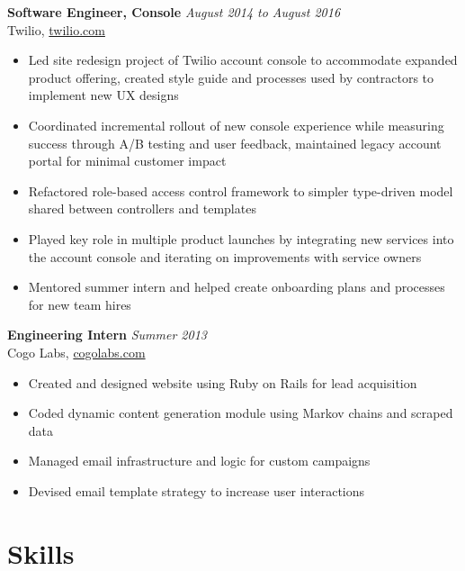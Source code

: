 \documentclass[margin,line]{resume}
\begin{document}
\begin{resume}
\textbf{Software Engineer, Console} \hfill \textsl{August 2014 to August 2016}\vspace{0mm}\\%
Twilio, \href{https://twilio.com}{twilio.com}\vspace{0mm}\\\vspace{-2mm}%
\begin{itemize}
\item Led site redesign project of Twilio account console to accommodate expanded product offering, created style guide and processes used by contractors to implement new UX designs
\item Coordinated incremental rollout of new console experience while measuring success through A/B testing and user feedback, maintained legacy account portal for minimal customer impact
\item Refactored role-based access control framework to simpler type-driven model shared between controllers and templates
\item Played key role in multiple product launches by integrating new services into the account console and iterating on improvements with service owners
\item Mentored summer intern and helped create onboarding plans and processes for new team hires
\end{itemize}

\textbf{Engineering Intern} \hfill \textsl{Summer 2013}\vspace{0mm}\\%
Cogo Labs, \href{https://cogolabs.com}{cogolabs.com}\vspace{0mm}\\\vspace{-2mm}%
\begin{itemize}
\item Created and designed website using Ruby on Rails for lead acquisition
\item Coded dynamic content generation module using Markov chains and scraped data
\item Managed email infrastructure and logic for custom campaigns
\item Devised email template strategy to increase user interactions
\end{itemize}
\section{\mysidestyle Skills}


\end{resume}
\end{document}
